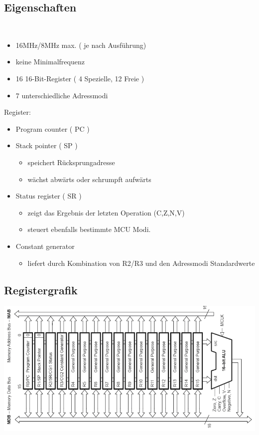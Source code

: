 \documentclass{beamer}
\begin{document}
\subsection{Eigenschaften}
\begin{frame}
\ \\
\begin{itemize}
\item 16MHz/8MHz max. ( je nach Ausführung)
\item keine Minimalfrequenz
\item 16 16-Bit-Register ( 4 Spezielle, 12 Freie )
\item 7 unterschiedliche Adressmodi
\end{itemize}
Register:
\begin{itemize}
\item Program counter ( PC )
\item Stack pointer ( SP )
\begin{itemize}
\item speichert Rücksprungadresse
\item wächst abwärts oder schrumpft aufwärts
\end{itemize}
\item Status register ( SR )
\begin{itemize}
\item zeigt das Ergebnis der letzten Operation (C,Z,N,V)
\item steuert ebenfalls bestimmte MCU Modi.
\end{itemize}
\item Constant generator
\begin{itemize}
\item liefert durch Kombination von R2/R3 und den Adressmodi Standardwerte
\end{itemize}
\end{itemize}
\end{frame}
\subsection{Registergrafik}
\begin{frame}
\includegraphics[scale=0.45,center]{MSP430_alu_dia.jpg}
\end{frame}
\end{document}
